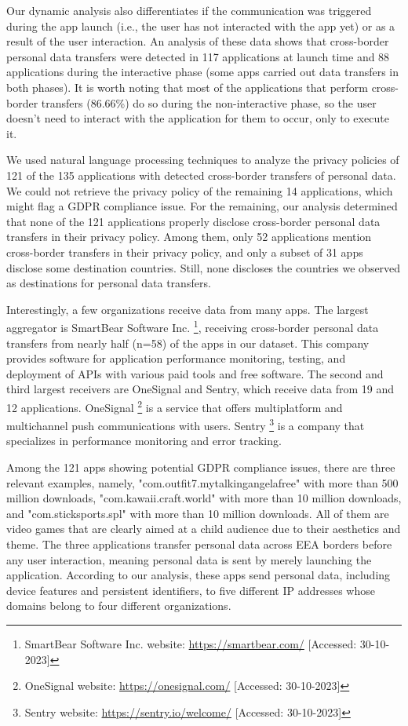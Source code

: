 \documentclass[preprint,12pt]{elsarticle}
\begin{document}
Our dynamic analysis also differentiates if the communication was triggered during the app launch (i.e., the user has not interacted with the app yet) or as a result of the user interaction. An analysis of these data shows that cross-border personal data transfers were detected in 117 applications at launch time and 88 applications during the interactive phase (some apps carried out data transfers in both phases). It is worth noting that most of the applications that perform cross-border transfers (86.66\%) do so during the non-interactive phase, so the user doesn't need to interact with the application for them to occur, only to execute it.

We used natural language processing techniques to analyze the privacy policies of 121 of the 135 applications with detected cross-border transfers of personal data. We could not retrieve the privacy policy of the remaining 14 applications, which might flag a GDPR compliance issue. For the remaining, our analysis determined that none of the 121 applications properly disclose cross-border personal data transfers in their privacy policy. Among them, only 52 applications mention cross-border transfers in their privacy policy, and only a subset of 31 apps disclose some destination countries. Still, none discloses the countries we observed as destinations for personal data transfers. 

Interestingly, a few organizations receive data from many apps. The largest aggregator is SmartBear Software Inc. \footnote{SmartBear Software Inc. website: \url{https://smartbear.com/} [Accessed: 30-10-2023]}, receiving cross-border personal data transfers from nearly half (n=58) of the apps in our dataset. This company provides software for application performance monitoring, testing, and deployment of APIs with various paid tools and free software. The second and third largest receivers are OneSignal and Sentry, which receive data from 19 and 12 applications. OneSignal \footnote{OneSignal website: \url{https://onesignal.com/} [Accessed: 30-10-2023]} is a service that offers multiplatform and multichannel push communications with users. Sentry \footnote{Sentry website: \url{https://sentry.io/welcome/} [Accessed: 30-10-2023]} is a company that specializes in performance monitoring and error tracking.

Among the 121 apps showing potential GDPR compliance issues, there are three relevant examples, namely, "com.outfit7.mytalkingangelafree" with more than 500 million downloads, "com.kawaii.craft.world" with more than 10 million downloads, and "com.sticksports.spl" with more than 10 million downloads. All of them are video games that are clearly aimed at a child audience due to their aesthetics and theme. The three applications transfer personal data across EEA borders before any user interaction, meaning personal data is sent by merely launching the application. According to our analysis, these apps send personal data, including device features and persistent identifiers, to five different IP addresses whose domains belong to four different organizations.
\end{document}
